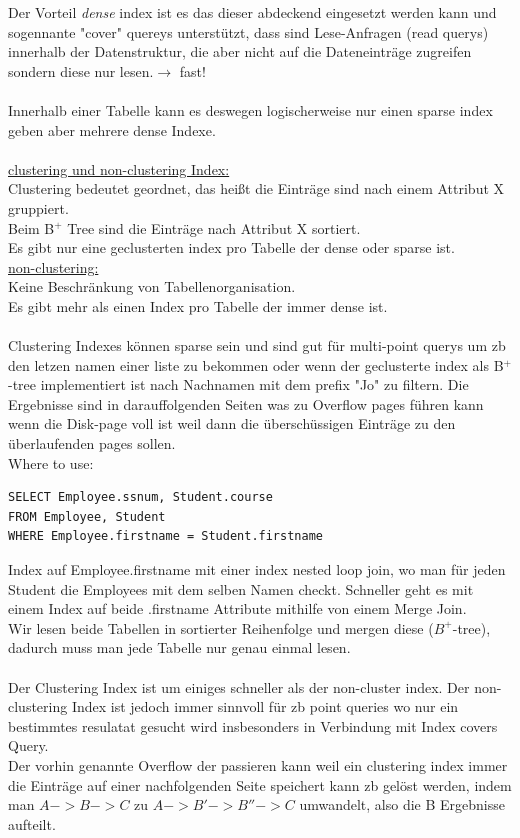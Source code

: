 \documentclass[12pt]{article}\pagestyle{myheadings}
\theoremstyle{plain}
\begin{document}
\begin{enumerate}
Der Vorteil \textit{dense }index ist es das dieser abdeckend eingesetzt werden kann und sogennante "cover" quereys unterstützt, dass sind Lese-Anfragen (read querys) innerhalb der Datenstruktur, die aber nicht auf die Dateneinträge zugreifen sondern diese nur lesen.$\rightarrow$ fast!\\ \\
Innerhalb einer Tabelle kann es deswegen logischerweise nur einen sparse index geben aber mehrere dense Indexe.\\ \\
\underline {clustering und non-clustering Index:}\\
Clustering bedeutet geordnet, das heißt die Einträge sind nach einem Attribut X gruppiert.\\
Beim B$^+$ Tree sind die Einträge nach Attribut X sortiert.\\
Es gibt nur eine geclusterten index pro Tabelle  der dense oder sparse ist.\\
\underline{non-clustering:}\\ Keine Beschränkung von Tabellenorganisation.\\
Es gibt mehr als einen Index pro Tabelle der immer dense ist.\\ \\
Clustering Indexes können sparse sein und sind gut für multi-point querys um zb den letzen namen einer liste zu bekommen oder wenn der geclusterte index als B$^+$-tree implementiert ist nach Nachnamen mit dem prefix "Jo" zu filtern.
Die Ergebnisse sind in darauffolgenden Seiten was zu Overflow pages führen kann wenn die Disk-page voll ist weil dann die überschüssigen Einträge zu den überlaufenden pages sollen.\\
Where to use:
\begin{verbatim}
SELECT Employee.ssnum, Student.course
FROM Employee, Student
WHERE Employee.firstname = Student.firstname
\end{verbatim}
Index auf Employee.firstname mit einer index nested loop join, wo man für jeden Student die Employees mit dem selben Namen checkt.
Schneller geht es mit einem Index auf beide $.$firstname Attribute mithilfe von einem Merge Join.\\
Wir lesen beide Tabellen in sortierter Reihenfolge und mergen diese ($B^+$-tree), dadurch muss man jede Tabelle nur genau einmal lesen.\\ \\
Der Clustering Index ist um einiges schneller als der non-cluster index.
Der non-clustering Index ist jedoch immer sinnvoll für zb point queries wo nur ein bestimmtes resulatat gesucht wird insbesonders in Verbindung mit Index covers Query.\\
Der vorhin genannte Overflow der passieren kann weil ein clustering index immer die Einträge auf einer nachfolgenden Seite speichert kann zb gelöst werden, indem man $A->B->C$ zu $A->B'->B''->C$ umwandelt, also die B Ergebnisse aufteilt.


\end{enumerate}
\end{document}
